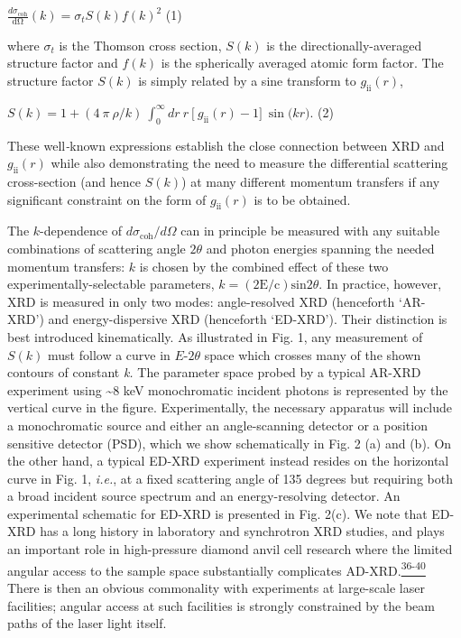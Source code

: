 \(\frac{d\sigma_{\text{coh}}}{\text{dΩ}}\left( k \right) = \sigma_{t}S\left( k \right){f\left( k \right)}^{2}\)
(1)

where \(\sigma_{t}\) is the Thomson cross section, \(S(k)\) is the
directionally-averaged structure factor and \(f\left( k \right)\) is the
spherically averaged atomic form factor. The structure factor \(S(k)\)
is simply related by a sine transform to
\(g_{\text{ii}}\left( r \right)\),

\(S\left( k \right) = 1 + (4\ \pi\ \rho/k)\ \int_{0}^{\infty}{dr\ r\ \lbrack\ g_{\text{ii}}\left( r \right) - 1\rbrack}\ \sin{(kr})\).
(2)

These well\emph{-}known expressions establish the close connection
between XRD and \(g_{\text{ii}}\left( r \right)\) while also
demonstrating the need to measure the differential scattering
cross-section (and hence \(S(k)\)) at many different momentum transfers
if any significant constraint on the form of
\(g_{\text{ii}}\left( r \right)\) is to be obtained.

The \(k\)-dependence of \(d\sigma_{\text{coh}}/d\Omega\) can in
principle be measured with any suitable combinations of scattering angle
\(2\theta\) and photon energies spanning the needed momentum transfers:
\(k\) is chosen by the combined effect of these two
experimentally-selectable parameters,
\(k = \operatorname{(2E/c)sin}{2\theta}\). In practice, however, XRD is
measured in only two modes: angle-resolved XRD (henceforth `AR-XRD') and
energy-dispersive XRD (henceforth `ED-XRD'). Their distinction is best
introduced kinematically. As illustrated in Fig. 1, any measurement of
\(S(k)\) must follow a curve in \(E\)-\(2\theta\) space which crosses
many of the shown contours of constant \emph{k.} The parameter space
probed by a typical AR-XRD experiment using \textasciitilde{}8 keV
monochromatic incident photons is represented by the vertical curve in
the figure. Experimentally, the necessary apparatus will include a
monochromatic source and either an angle-scanning detector or a position
sensitive detector (PSD), which we show schematically in Fig. 2 (a) and
(b). On the other hand, a typical ED-XRD experiment instead resides on
the horizontal curve in Fig. 1, \emph{i.e.}, at a fixed scattering angle
of 135 degrees but requiring both a broad incident source spectrum and
an energy-resolving detector. An experimental schematic for ED-XRD is
presented in Fig. 2(c). We note that ED-XRD has a long history in
laboratory and synchrotron XRD studies, and plays an important role in
high-pressure diamond anvil cell research where the limited angular
access to the sample space substantially complicates
AD-XRD.\hyperref[y.-feng-m.-somayazulu-r.-jaramillo-t.-rosenbaum-e.-isaacs-j.-hu-and-h.-k.-mao-review-of-scientific-instruments-76-063913-2005.]{\textsuperscript{36-40}}
There is then an obvious commonality with experiments at large-scale
laser facilities; angular access at such facilities is strongly
constrained by the beam paths of the laser light itself.

